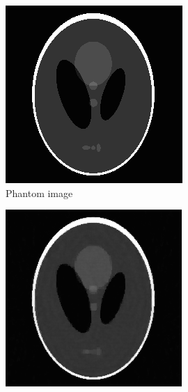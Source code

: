 \begin{figure}[!htb] \centering
    \begin{subfigure}{0.45\linewidth}
    	\centering
        \includegraphics[width=0.9\linewidth]{./figs/phantom_img.png}
         \caption{Phantom image}\label{fig:pds_a}		
        \label{fig:a}
    \end{subfigure} %
    \quad
    \begin{subfigure}{0.45\linewidth}
    	\centering
        \includegraphics[width=0.9\linewidth]{./figs/phantom_pds_img.png}

\end{subfigure}
\end{figure}
